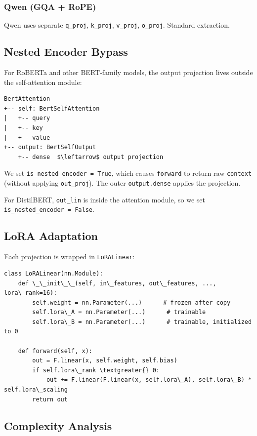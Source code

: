 \subsubsection{Qwen (GQA + RoPE)}

Qwen uses separate \texttt{q\_proj}, \texttt{k\_proj}, \texttt{v\_proj}, \texttt{o\_proj}. Standard extraction.

\subsection{Nested Encoder Bypass}

For RoBERTa and other BERT-family models, the output projection lives 
outside the self-attention module:

\begin{lstlisting}
BertAttention
+-- self: BertSelfAttention
|   +-- query
|   +-- key
|   +-- value
+-- output: BertSelfOutput
    +-- dense  $\leftarrow$ output projection
\end{lstlisting}

We set \texttt{is\_nested\_encoder = True}, which causes \texttt{forward} to return raw 
\texttt{context} (without applying \texttt{out\_proj}). The outer \texttt{output.dense} applies 
the projection.

For DistilBERT, \texttt{out\_lin} is inside the attention module, so we set 
\texttt{is\_nested\_encoder = False}.

\subsection{LoRA Adaptation}

Each projection is wrapped in \texttt{LoRALinear}:

\begin{lstlisting}
class LoRALinear(nn.Module):
    def \_\_init\_\_(self, in\_features, out\_features, ..., lora\_rank=16):
        self.weight = nn.Parameter(...)      # frozen after copy
        self.lora\_A = nn.Parameter(...)      # trainable
        self.lora\_B = nn.Parameter(...)      # trainable, initialized to 0
    
    def forward(self, x):
        out = F.linear(x, self.weight, self.bias)
        if self.lora\_rank \textgreater{} 0:
            out += F.linear(F.linear(x, self.lora\_A), self.lora\_B) * self.lora\_scaling
        return out
\end{lstlisting}

\subsection{Complexity Analysis}

